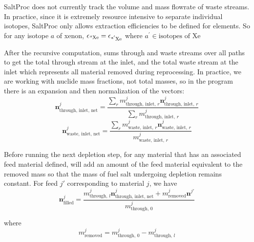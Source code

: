 SaltProc does not currently track the volume and mass flowrate of waste streams.
In practice, since it is extremely resource intensive to separate individual
isotopes, SaltProc only allows extraction efficiencies to be defined for
elements. So for any isotope $a$ of xenon,
$\epsilon_{\ce{^{a}Xe}} = \epsilon_{\ce{^{a^{\prime}}Xe}}$  where
$a^{\prime} \in \text{isotopes of Xe}$

After the recursive computation, \SaltProc sums through and waste streams over all
paths to get the total through stream at the inlet, and the total waste stream at
the inlet which represents all material removed during reprocessing. In practice,
we are working with nuclide mass fractions, not total masses, so in the program
there is an expansion and then normalization of the vectors:
\begin{equation}
    \mathbf{n}^{j}_\text{through, inlet, net} = \frac{\sum_{r} m^{j}_{\text{through, inlet, }r} \mathbf{n}^{j}_{\text{through, inlet, }r}}{\sum_{r} m^{j}_{\text{through, inlet, }r}}
\end{equation}
\begin{equation}
    \mathbf{n}^{j}_{\text{waste, inlet, net}} = \frac{\sum_{r} m^{j}_{\text{waste, inlet, }r} \mathbf{n}^{j}_{\text{waste, inlet, }r}}{m^{j}_{\text{waste, inlet, }r}}
\end{equation}

Before running the next depletion step, for any material that has an associated
feed material defined, \SaltProc will add an amount of the feed material
equivalent to the removed mass so that the mass of fuel salt undergoing depletion
remains constant. For feed $j'$ corresponding to material $j$, we have
\begin{equation}
    \mathbf{n}^{j}_\text{filled} = \frac{m^{j}_{\text{through, }l}\mathbf{n}^{j}_\text{through, inlet, net} +  m^{j}_{\text{removed}}\mathbf{n}^{j'}}{m^{j}_{\text{through, }0}}
\end{equation}

where 
\begin{equation}
    m^{j}_\text{removed} = m^{j}_{\text{through, }0} - m^{j}_{\text{through, }l}
\end{equation}

